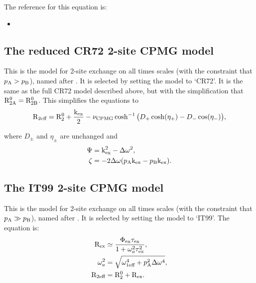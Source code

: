 The reference for this equation is:
\begin{itemize}
\item {}
\end{itemize}




\subsection{The reduced CR72 2-site CPMG model}
\label{sect: dispersion: CR72 model}

This is the model for 2-site exchange on all times scales (with the constraint that $p_\textrm{A} > p_\textrm{B}$), named after \citet{CarverRichards72}.
It is selected by setting the model to `CR72'.
It is the same as the full CR72 model described above, but with the simplification that $\mathrm{R}_\mathrm{2A}^0 = \mathrm{R}_\mathrm{2B}^0$.
This simplifies the equations to
\begin{equation}
    \mathrm{R}_\textrm{2eff} = \mathrm{R}_2^0 + \frac{\textrm{k}_\textrm{ex}}{2} - \nu_\textrm{CPMG}\cosh^{-1} \big( D_+\cosh(\eta_+) - D_-\cos(\eta_-) \big) ,
\end{equation}

where $D_\pm$ and $\eta_\pm$ are unchanged and
\begin{align}
    \Psi  &= \textrm{k}_\textrm{ex}^2 - \Delta\omega^2 , \\
    \zeta &= -2\Delta\omega (p_\textrm{A}\textrm{k}_\textrm{ex} - p_\textrm{B}\textrm{k}_\textrm{ex}) .
\end{align}




\subsection{The IT99 2-site CPMG model}
\label{sect: dispersion: IT99 model}

This is the model for 2-site exchange on all times scales (with the constraint that $p_\textrm{A} \gg p_\textrm{B}$), named after \citet{IshimaTorchia99}.  It is selected by setting the model to `IT99'.  The equation is:
\begin{align}
    \mathrm{R}_\textrm{ex}       &\simeq \frac{\Phi_\textrm{ex}\tau_\textrm{ex}}{1 + \omega_a^2\tau_\textrm{ex}^2} , \\
    \omega_a^2 &= \sqrt{\omega_\textrm{1eff}^4 + p_\textrm{A}^2\Delta\omega^4} , \\
    \mathrm{R}_\textrm{2eff}   &= \mathrm{R}_2^0 + \mathrm{R}_\textrm{ex} .
\end{align}

